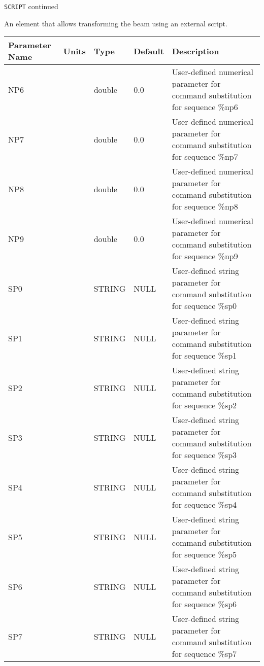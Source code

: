 \begin{latexonly}
\newpage
\begin{center}{\Large\verb|SCRIPT| continued}\end{center}
\end{latexonly}
An element that allows transforming the beam using an external script.
\\
\begin{tabular}{|l|l|l|l|p{\descwidth}|} \hline
Parameter Name & Units & Type & Default & Description \\ \hline 
NP6 &  & double &  0.0 & User-defined numerical parameter for command substitution for sequence \%np6  \\ \hline 
NP7 &  & double &  0.0 & User-defined numerical parameter for command substitution for sequence \%np7  \\ \hline 
NP8 &  & double &  0.0 & User-defined numerical parameter for command substitution for sequence \%np8  \\ \hline 
NP9 &  & double &  0.0 & User-defined numerical parameter for command substitution for sequence \%np9  \\ \hline 
SP0 &  & STRING &   NULL            & User-defined string parameter for command substitution for sequence \%sp0  \\ \hline 
SP1 &  & STRING &   NULL            & User-defined string parameter for command substitution for sequence \%sp1  \\ \hline 
SP2 &  & STRING &   NULL            & User-defined string parameter for command substitution for sequence \%sp2  \\ \hline 
SP3 &  & STRING &   NULL            & User-defined string parameter for command substitution for sequence \%sp3  \\ \hline 
SP4 &  & STRING &   NULL            & User-defined string parameter for command substitution for sequence \%sp4  \\ \hline 
SP5 &  & STRING &   NULL            & User-defined string parameter for command substitution for sequence \%sp5  \\ \hline 
SP6 &  & STRING &   NULL            & User-defined string parameter for command substitution for sequence \%sp6  \\ \hline 
SP7 &  & STRING &   NULL            & User-defined string parameter for command substitution for sequence \%sp7  \\ \hline 
\end{tabular}

